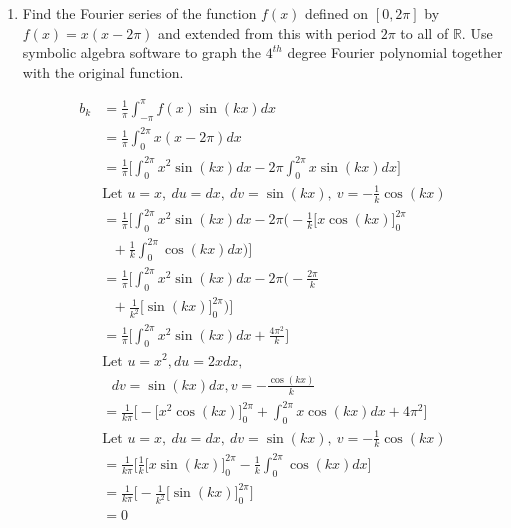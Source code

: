 \documentclass{article}
\begin{document}
\begin{enumerate}
\newpage

\item Find the Fourier series of the function $f(x)$ defined on $[0,2\pi]$ by $f(x) = x(x-2\pi)$ and extended from this with period $2\pi$ to all of $\mathbb{R}$. Use symbolic algebra software to graph the $4^{th}$ degree Fourier polynomial together with the original function.
\begin{multicols}{2} 
\noindent

\begin{align*}
    b_k &= \frac{1}{\pi} \int_{-\pi}^{\pi}f(x)\sin(kx) dx \\
    &= \frac{1}{\pi} \int_{0}^{2\pi} x(x-2\pi) dx \\
    &= \frac{1}{\pi} \Bigg[ \int_{0}^{2\pi} x^2\sin(kx) dx - 2\pi\int_{0}^{2\pi} x\sin(kx) dx \Bigg] \\
    &\text{Let } u = x,\: du = dx,\: dv = \sin(kx),\: v = -\frac{1}{k}\cos(kx) \\
    &= \frac{1}{\pi} \Bigg[ \int_{0}^{2\pi} x^2\sin(kx) dx - 2\pi\Big( -\frac{1}{k} \Big[ x\cos(kx)\Big]_{0}^{2\pi} \\
    & \: \: \: + \frac{1}{k}\int_{0}^{2\pi} \cos(kx) dx \Big) \Bigg] \\
    &= \frac{1}{\pi} \Bigg[ \int_{0}^{2\pi} x^2\sin(kx) dx - 2\pi\Big( -\frac{2\pi}{k} \\ 
    & \: \: \: + \frac{1}{k^2} \Big[\sin(kx) \Big]_{0}^{2\pi} \Big) \Bigg] \\
    &= \frac{1}{\pi} \Bigg[ \int_{0}^{2\pi} x^2\sin(kx) dx + \frac{4\pi^2}{k} \Bigg] \\
    &\text{Let }u = x^2, du = 2xdx, \\
    & \: \: \: dv = \sin(kx) dx, v = -\frac{\cos(kx)}{k} \\
    &= \frac{1}{k\pi} \Bigg[ -\Big[ x^2 \cos(kx) \Big]_{0}^{2\pi} + \int_{0}^{2\pi} x\cos(kx) dx  + 4\pi^2 \Bigg] \\
    &\text{Let } u = x,\: du = dx,\: dv = \sin(kx),\: v = -\frac{1}{k}\cos(kx) \\
    &= \frac{1}{k\pi} \Bigg[  \frac{1}{k}\Big[ x\sin(kx) \Big]_{0}^{2\pi} - \frac{1}{k}\int_{0}^{2\pi} \cos(kx) dx \Bigg] \\
    &= \frac{1}{k\pi} \Bigg[  - \frac{1}{k^2}\Big[ \sin(kx) \Big]_{0}^{2\pi} \Bigg] \\
    &= 0
\end{align*} 


\end{multicols}
\end{enumerate}
\end{document}

